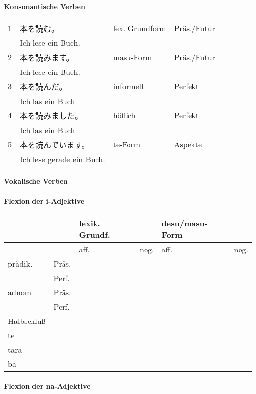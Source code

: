 \documentclass[justified, a4paper, notitlepage, captions=tableheading, nobib]{tufte-handout}
\begin{document}
\paragraph{Konsonantische Verben}
\label{sec:org61dc7a9}

\begin{tabular}{rlll}
1 & 本を読む。 & lex. Grundform & Präs./Futur\\
 & Ich lese ein Buch. &  & \\
2 & 本を読みます。 & masu-Form & Präs./Futur\\
 & Ich lese ein Buch. &  & \\
3 & 本を読んだ。 & informell & Perfekt\\
 & Ich las ein Buch &  & \\
4 & 本を読みました。 & höflich & Perfekt\\
 & Ich las ein Buch &  & \\
5 & 本を読んでいます。 & te-Form & Aspekte\\
 & Ich lese gerade ein Buch. &  & \\
\end{tabular}

\paragraph{Vokalische Verben}
\label{sec:orgd541f29}

\paragraph{Flexion der i-Adjektive}
\label{sec:org162fb5d}

\begin{tabular}{llllll}
 &  & lexik. Grundf. &  & desu/masu-Form & \\
\hline
 &  & aff. & neg. & aff. & neg.\\
\hline
prädik. & Präs. &  &  &  & \\
 & Perf. &  &  &  & \\
adnom. & Präs. &  &  &  & \\
 & Perf. &  &  &  & \\
Halbschluß &  &  &  &  & \\
te &  &  &  &  & \\
tara &  &  &  &  & \\
ba &  &  &  &  & \\
\end{tabular}

\paragraph{Flexion der na-Adjektive}
\label{sec:orgd133e5a}
\end{document}
